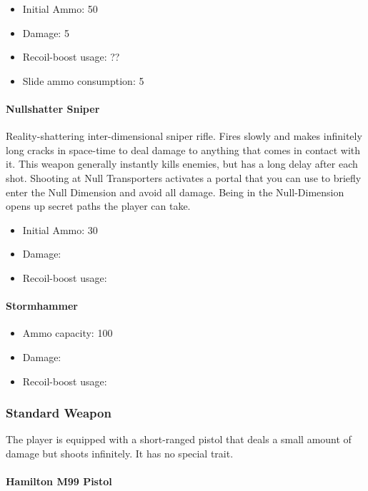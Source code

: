 \documentclass[12pt]{article}
\begin{document}
\begin{itemize}
	\item Initial Ammo: 50
	\item Damage: 5
	\item Recoil-boost usage: ??
	\item Slide ammo consumption: 5
\end{itemize} 


\paragraph{Nullshatter Sniper}

Reality-shattering inter-dimensional sniper rifle. Fires slowly and makes infinitely long cracks in space-time to deal damage to anything that comes in contact with it. This weapon generally instantly kills enemies, but has a long delay after each shot. Shooting at Null Transporters activates a portal that you can use to briefly enter the Null Dimension and avoid all damage. Being in the Null-Dimension opens up secret paths the player can take.

\begin{itemize}
	\item Initial Ammo: 30
	\item Damage: 
	\item Recoil-boost usage:
\end{itemize}

\paragraph{Stormhammer}

\begin{itemize}
	\item Ammo capacity: 100%
	\item Damage: 
	\item Recoil-boost usage:
\end{itemize}

\subsubsection{Standard Weapon}

The player is equipped with a short-ranged pistol that deals a small amount of damage but shoots infinitely. It has no special trait.

\paragraph{Hamilton M99 Pistol} 
\end{document}
